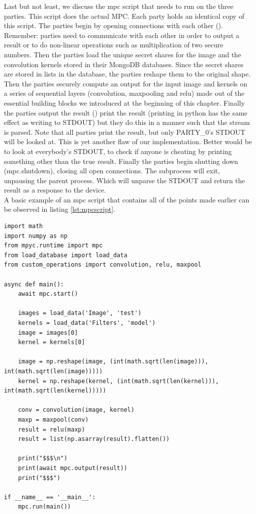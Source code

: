 Last but not least, we discuss the mpc script that needs to run on the three parties. This script does the actual MPC. Each party holds an identical copy of this script. The parties begin by opening connections with each other (). Remember: parties need to communicate with each other in order to output a result or to do non-linear operations such as multiplication of two secure numbers. Then the parties load the unique secret shares for the image and the convolution kernels stored in their MongoDB databases. Since the secret shares are stored in lists in the database, the parties reshape them to the original shape. Then the parties securely compute an output for the input image and kernels on a series of sequential layers (convolution, maxpooling and relu) made out of the essential building blocks we introduced at the beginning of this chapter. Finally the parties output the result () print the result (printing in python has the same effect as writing to STDOUT) but they do this in a manner such that the stream is parsed. Note that all parties print the result, but only PARTY\_0's STDOUT will be looked at. This is yet another flaw of our implementation. Better would be to look at everybody's STDOUT, to check if anyone is cheating by printing something other than the true result. Finally the parties begin shutting down (mpc.shutdown), closing all open connections. The subprocess will exit, unpausing the parent process. Which will unparse the STDOUT and return the result as a response to the device.\\

 A basic example of an mpc script that contains all of the points made earlier can be observed in listing \ref{lst:mpcscript}.

\begin{lstlisting}[caption={Example of MPC script for a single CNN layer (conv,maxp and relu)}, label={lst:mpcscript}, frame=single, breaklines=true]
import math
import numpy as np
from mpyc.runtime import mpc
from load_database import load_data
from custom_operations import convolution, relu, maxpool

async def main():
    await mpc.start()

    images = load_data('Image', 'test')
    kernels = load_data('Filters', 'model')
    image = images[0]
    kernel = kernels[0]

    image = np.reshape(image, (int(math.sqrt(len(image))), int(math.sqrt(len(image)))))
    kernel = np.reshape(kernel, (int(math.sqrt(len(kernel))), int(math.sqrt(len(kernel)))))

    conv = convolution(image, kernel)
    maxp = maxpool(conv)
    result = relu(maxp)
    result = list(np.asarray(result).flatten())

    print("$$$\n")
    print(await mpc.output(result))
    print("$$$")

if __name__ == '__main__':
    mpc.run(main())
\end{lstlisting}

